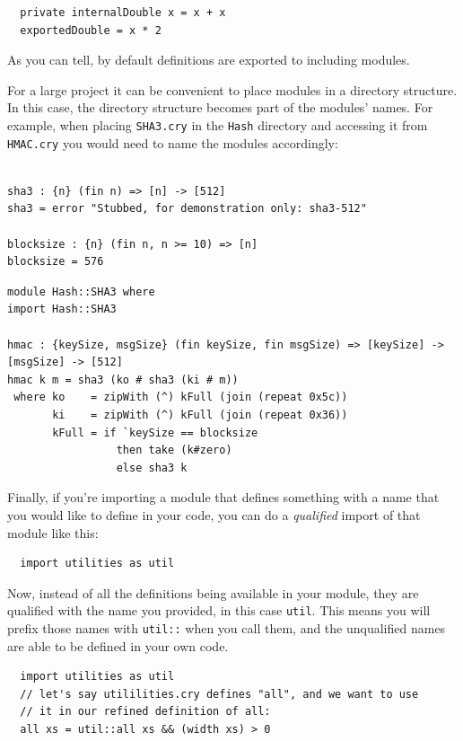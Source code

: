 \begin{verbatim}
  private internalDouble x = x + x
  exportedDouble = x * 2
\end{verbatim}

As you can tell, by default definitions are exported to including modules.

For a large project it can be convenient to place modules in a directory
structure.  In this case, the directory structure becomes part of the modules'
names.  For example, when placing \verb+SHA3.cry+ in the \verb+Hash+ directory and
accessing it from \verb+HMAC.cry+ you would need to name the modules
accordingly:

\begin{verbatim}

sha3 : {n} (fin n) => [n] -> [512]
sha3 = error "Stubbed, for demonstration only: sha3-512"

blocksize : {n} (fin n, n >= 10) => [n]
blocksize = 576
\end{verbatim}

\begin{verbatim}
module Hash::SHA3 where
import Hash::SHA3

hmac : {keySize, msgSize} (fin keySize, fin msgSize) => [keySize] -> [msgSize] -> [512]
hmac k m = sha3 (ko # sha3 (ki # m))
 where ko    = zipWith (^) kFull (join (repeat 0x5c))
       ki    = zipWith (^) kFull (join (repeat 0x36))
       kFull = if `keySize == blocksize
                 then take (k#zero)
                 else sha3 k
\end{verbatim}

Finally, if you're importing a module that defines something with
a name that you would like to define in your code, you can do a
{\it qualified} import of that module like this:

\begin{verbatim}
  import utilities as util
\end{verbatim}

Now, instead of all the definitions being available in your module,
they are qualified with the name you provided, in this case \verb+util+.
This means you will prefix those names with \verb+util::+ when you call them,
and the unqualified names are able to be defined in your own code.

\begin{verbatim}
  import utilities as util
  // let's say utililities.cry defines "all", and we want to use
  // it in our refined definition of all:
  all xs = util::all xs && (width xs) > 0
\end{verbatim}

